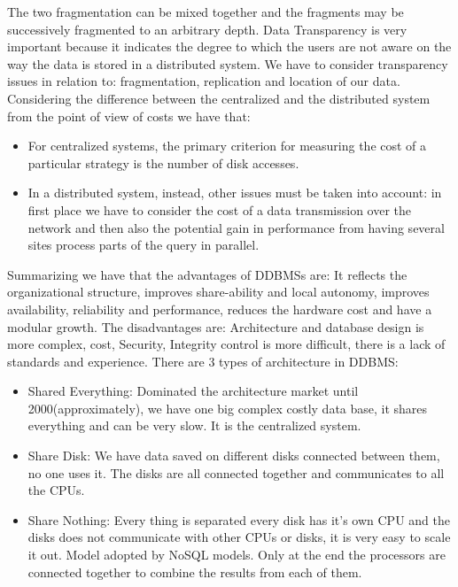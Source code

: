 \documentclass[a4page, 11pt]{article}
\begin{document}
The two fragmentation can be mixed together and the fragments may be successively fragmented to an arbitrary depth. 
Data Transparency is very important because it indicates the degree to which the users are not aware on the way the data is stored in a  distributed system. 
We have to consider transparency issues in relation to: fragmentation, replication and location of our data.
\newline
Considering the difference between the centralized and the distributed system from the point of view of costs we have that:
\begin{itemize}[noitemsep]
\item For centralized systems, the primary criterion for measuring the cost of a particular strategy is the number of disk accesses.
\item In a distributed system, instead, other issues must be taken into account: in first place we have to consider the cost of a data transmission over the network and then also the potential gain in performance from having several sites process parts of the query in parallel.
\end{itemize}
Summarizing we have that the advantages of DDBMSs are: It reflects the organizational structure, improves share-ability and local autonomy, improves availability, reliability and performance, reduces the hardware cost and have a modular growth.
The disadvantages are: Architecture and database design is more complex, cost, Security, Integrity control is more difficult, there is a lack of standards and experience.
\newline
There are 3 types of architecture in DDBMS:
\begin{itemize}
\item Shared Everything: Dominated the architecture market until 2000(approximately), we have one big complex costly data base, it shares everything and can be very slow. It is the centralized system.

\item Share Disk: We have data saved on different disks connected between them, no one uses it. The disks are all connected together and communicates to all the CPUs.

\item Share Nothing: Every thing is separated every disk has it's own CPU and the disks does not communicate with other CPUs or disks, it is very easy to scale it out. Model adopted by NoSQL models. Only at the end the processors are connected together to combine the results from each of them. 
\end{itemize}
\end{document}
